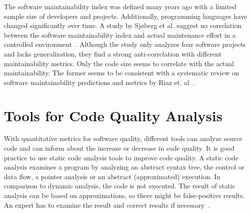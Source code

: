 The software maintainability index was defined many years ago with a limited sample size of developers and projects. Additionally, programming languages have changed significantly over time. A study by Sjøberg et al. suggest no correlation between the software maintainability index and actual maintenance effort in a controlled environment~\cite{sjoberg_questioning_nodate}. Although the study only analyzes four software projects and lacks generalization, they find a strong anti-correlation with different maintainability metrics. Only the code size seems to correlate with the actual maintainability. The former seems to be consistent with a systematic review on software maintainability predictions and metrics by Riaz et. al~\cite{riaz_systematic_2009}.



\section{Tools for Code Quality Analysis}\label{sec:tool_comparison}
With quantitative metrics for software quality, different tools can analyze source code and can inform about the increase or decrease in code quality. It is good practice to use static code analysis tools to improve code quality. A static code analysis examines a program by analyzing an abstract syntax tree, the control or data flow, a pointer analysis or an abstract (approximated) execution. In comparison to dynamic analysis, the code is not executed. The result of static analysis can be based on approximations, so there might be false-positive results. An expert has to examine the result and correct results if necessary~\cite{prahofer_static_2017}.

